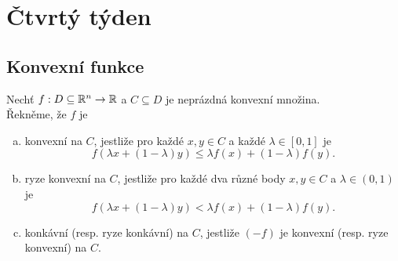 \section{Čtvrtý týden}

\subsection{Konvexní funkce}\label{defKonv}
Nechť $f : D \subseteq \mathbb{R}^n \rightarrow \mathbb{R}$ a $C \subseteq D$ je neprázdná konvexní množina. \\
Řekněme, že $f$ je
\begin{enumerate}[(a)]
    \item konvexní na $C$, jestliže pro každé $x, y \in C$ a každé $\lambda \in [0,1]$ je 
    \[
        f(\lambda x + (1-\lambda) y) \leq \lambda f(x) + (1-\lambda)f(y).
    \]
    \item ryze konvexní na $C$, jestliže pro každé dva různé body $x, y \in C$ a $\lambda \in (0,1)$ je
    \[
        f(\lambda x + (1-\lambda) y) < \lambda f(x) + (1-\lambda)f(y).
    \]
    \item konkávní (resp. ryze konkávní) na $C$, jestliže $(-f)$ je konvexní (resp. ryze konvexní) na $C$.
\end{enumerate}

